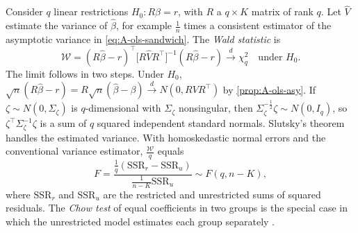 Consider $q$ linear restrictions $H_0\colon R\beta = r$, with $R$ a $q \times K$ matrix of rank $q$. Let
$\hat V$ estimate the variance of $\hat\beta$, for example $\frac{1}{n}$ times a consistent estimator of the
asymptotic variance in \eqref{eq:A-ols-sandwich}. The \emph{Wald statistic} is
\begin{equation}\label{eq:A-wald}
\mathcal{W} = (R\hat\beta - r)^\top\bigl[R\hat VR^\top\bigr]^{-1}(R\hat\beta - r) \xrightarrow{d} \chi^2_q
\quad\text{under } H_0 .
\end{equation}
The limit follows in two steps. Under $H_0$, $\sqrt{n}(R\hat\beta - r) = R\sqrt{n}(\hat\beta - \beta)
\xrightarrow{d} N(0, RVR^\top)$ by \cref{prop:A-ols-asy}. If $\zeta \sim N(0, \Sigma_\zeta)$ is $q$-dimensional
with $\Sigma_\zeta$ nonsingular, then $\Sigma_\zeta^{-\frac{1}{2}}\zeta \sim N(0, I_q)$, so
$\zeta^\top\Sigma_\zeta^{-1}\zeta$ is a sum of $q$ squared independent standard normals. Slutsky's theorem
handles the estimated variance. With homoskedastic normal errors and the conventional variance estimator,
$\frac{\mathcal{W}}{q}$ equals
\begin{equation*}
F = \frac{\frac{1}{q}(\mathrm{SSR}_r - \mathrm{SSR}_u)}{\frac{1}{n - K}\mathrm{SSR}_u} \sim F(q, n - K) ,
\end{equation*}
where $\mathrm{SSR}_r$ and $\mathrm{SSR}_u$ are the restricted and unrestricted sums of squared residuals. The
\emph{Chow test} of equal coefficients in two groups is the special case in which the unrestricted model
estimates each group separately \citep{Chow1960a}.

